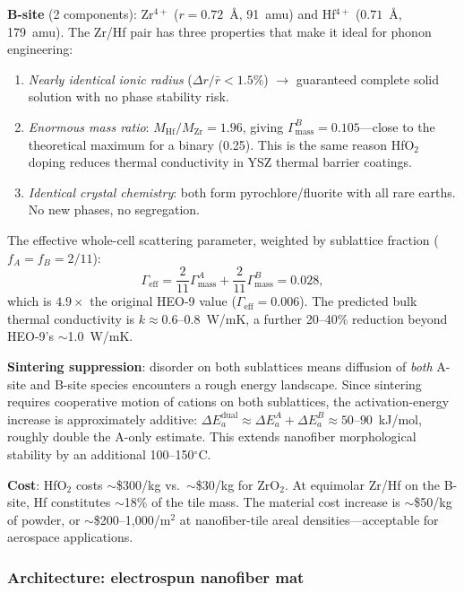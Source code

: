 \documentclass[12pt,letterpaper]{article}
\theoremstyle{definition}
\begin{document}
\textbf{B-site} (2 components): Zr$^{4+}$ ($r = 0.72$~\AA, 91~amu) and Hf$^{4+}$ ($0.71$~\AA, 179~amu).  The Zr/Hf pair has three properties that make it ideal for phonon engineering:
\begin{enumerate}
  \item \emph{Nearly identical ionic radius} ($\Delta r / \bar{r} < 1.5\%$) $\to$ guaranteed complete solid solution with no phase stability risk.
  \item \emph{Enormous mass ratio}: $M_{\mathrm{Hf}}/M_{\mathrm{Zr}} = 1.96$, giving $\Gamma_{\mathrm{mass}}^B = 0.105$---close to the theoretical maximum for a binary (0.25).  This is the same reason HfO$_2$ doping reduces thermal conductivity in YSZ thermal barrier coatings.
  \item \emph{Identical crystal chemistry}: both form pyrochlore/fluorite with all rare earths.  No new phases, no segregation.
\end{enumerate}

The effective whole-cell scattering parameter, weighted by sublattice fraction ($f_A = f_B = 2/11$):
\begin{equation}
  \Gamma_{\mathrm{eff}} = \frac{2}{11}\Gamma_{\mathrm{mass}}^A + \frac{2}{11}\Gamma_{\mathrm{mass}}^B = 0.028,
\end{equation}
which is $4.9\times$ the original HEO-9 value ($\Gamma_{\mathrm{eff}} = 0.006$).  The predicted bulk thermal conductivity is $k \approx 0.6$--$0.8$~W/mK, a further 20--40\% reduction beyond HEO-9's $\sim$1.0~W/mK.

\textbf{Sintering suppression}: disorder on both sublattices means diffusion of \emph{both} A-site and B-site species encounters a rough energy landscape.  Since sintering requires cooperative motion of cations on both sublattices, the activation-energy increase is approximately additive: $\Delta E_a^{\mathrm{dual}} \approx \Delta E_a^A + \Delta E_a^B \approx 50$--$90$~kJ/mol, roughly double the A-only estimate.  This extends nanofiber morphological stability by an additional 100--150$^\circ$C.

\textbf{Cost}: HfO$_2$ costs $\sim$\$300/kg vs.\ $\sim$\$30/kg for ZrO$_2$.  At equimolar Zr/Hf on the B-site, Hf constitutes $\sim$18\% of the tile mass.  The material cost increase is $\sim$\$50/kg of powder, or $\sim$\$200--1,000/m$^2$ at nanofiber-tile areal densities---acceptable for aerospace applications.

\subsubsection{Architecture: electrospun nanofiber mat}
\end{document}
